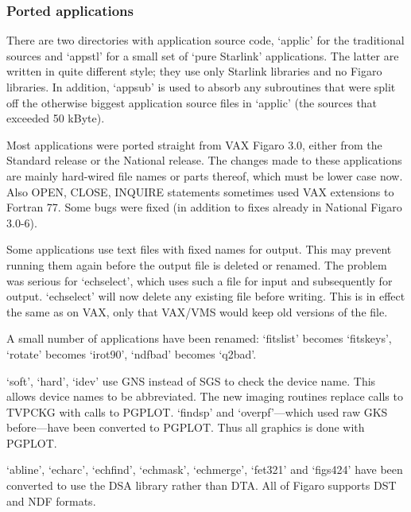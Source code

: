 \documentclass[11pt,twoside]{article}
\newcommand{\latorhtm}[2]{#1}
\newcommand{\latorhtm}[2]{#2}
\begin{document}

\subsubsection{\label{changessub3}Ported applications}

   There are two directories with application source code, `applic' for
   the traditional sources and `appstl' for a small set of `pure
   Starlink' applications.  The latter are written in quite different
   style; they use only Starlink libraries and no Figaro libraries.  In
   addition, `appsub' is used to absorb any subroutines that were split
   off the otherwise biggest application source files in
   `applic' (the sources that exceeded 50 kByte).

   Most applications were ported straight from VAX Figaro 3.0, either
   from the Standard release or the National release. The changes made
   to these applications are mainly hard-wired file names or parts
   thereof, which must be lower case now. Also OPEN, CLOSE, INQUIRE
   statements sometimes used VAX extensions to Fortran 77. Some bugs
   were fixed (in addition to fixes already in National Figaro 3.0-6).

   Some applications use text files with fixed names for output.  This
   may prevent running them again before the output file is deleted or
   renamed. The problem was serious for `echselect', which uses such a
   file for input and subsequently for output. `echselect' will now
   delete any existing file before writing.  This is in effect the same
   as on VAX, only that VAX/VMS would keep old versions of the file.

   A small number of applications have been renamed: `fitslist' becomes
   `fitskeys', `rotate' becomes `irot90', `ndfbad' becomes `q2bad'.

   `soft', `hard', `idev' use GNS instead of SGS to check the device
   name. This allows device names to be abbreviated. The new imaging
   routines replace calls to TVPCKG with calls to PGPLOT. `findsp' and
   `overpf'\latorhtm{---}{-}which used raw GKS before\latorhtm{---}{-}have
   been converted to PGPLOT. Thus all graphics is done with PGPLOT.

   `abline', `echarc', `echfind', `echmask', `echmerge', `fet321' and
   `figs424' have been converted to use the DSA library rather than DTA.
   All of Figaro supports DST and NDF formats.
\end{document}
